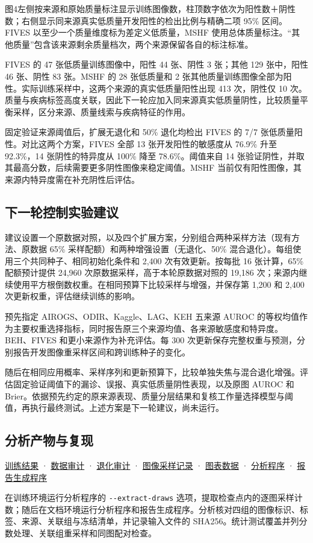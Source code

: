 \documentclass[
  10pt,
]{article}
\begin{document}
图4左侧按来源和原始质量标注显示训练图像数，柱顶数字依次为阳性数＋阴性数；右侧显示同来源真实低质量开发阳性的检出比例与精确二项
95\% 区间。FIVES 以至少一个质量维度标为差定义低质量，MSHF
使用总体质量标注。``其他质量''包含该来源剩余质量档次，两个来源保留各自的标注标准。

FIVES 的 47 张低质量训练图像中，阳性 44 张、阴性 3 张；其他 129
张中，阳性 46 张、阴性 83 张。MSHF 的 28 张低质量和 2
张其他质量训练图像全部为阳性。实际训练采样中，这两个来源的真实低质量阳性出现
413 次，阴性仅 10
次。质量与疾病标签高度关联，因此下一轮应加入同来源真实低质量阴性，比较质量平衡采样，区分来源、质量线索与疾病特征的作用。

固定验证来源阈值后，扩展无退化和 50\% 退化均检出 FIVES 的 7/7
张低质量阳性。对比这两个方案，FIVES 全部 13 张开发阳性的敏感度从 76.9\%
升至 92.3\%，14 张阴性的特异度从 100\% 降至 78.6\%。阈值来自 14
张验证阴性，并取其最高分数，后续需要更多阴性图像来稳定阈值。MSHF
当前仅有阳性图像，其来源内特异度需在补充阴性后评估。

\subsection{下一轮控制实验建议}\label{ux4e0bux4e00ux8f6eux63a7ux5236ux5b9eux9a8cux5efaux8bae}

建议设置一个原数据对照，以及四个扩展方案，分别组合两种采样方法（现有方法、原数据
65\% 采样配额）和两种增强设置（无退化、50\%
混合退化）。每组使用三个共同种子、相同初始化条件和 2,400
次有效更新。按每批 16 张计算，65\% 配额预计提供 24,960
次原数据采样，高于本轮原数据对照的 19,186
次；来源内继续使用平方根倒数权重。在相同预算下比较采样与增强，并保存第
1,200 和 2,400 次更新权重，评估继续训练的影响。

预先指定 AIROGS、ODIR、Kaggle、LAG、KEH 五来源 AUROC
的等权均值作为主要权重选择指标，同时报告原三个来源均值、各来源敏感度和特异度。BEH、FIVES
和更小来源作为补充评估。每 300
次更新保存完整权重与预测，分别报告开发图像重采样区间和跨训练种子的变化。

随后在相同应用概率、采样序列和更新预算下，比较单独失焦与混合退化增强。评估固定验证阈值下的漏诊、误报、真实低质量阴性表现，以及原图
AUROC 和
Brier。依据预先约定的原来源表现、质量分层结果和复核工作量选择模型与阈值，再执行最终测试。上述方案是下一轮建议，尚未运行。

\subsection{分析产物与复现}\label{ux5206ux6790ux4ea7ux7269ux4e0eux590dux73b0}

\href{../training-results/training-results.zh.md}{训练结果} ·
\href{../training-results/data-audit.zh.md}{数据审计} ·
\href{../training-results/degradation-audit.zh.md}{退化审计} ·
\href{training-exposure.json}{图像采样记录} ·
\href{figure-data.json}{图表数据} ·
\href{../../../../tools/analyze_expansion_results_20261113.py}{分析程序}
·
\href{../../../../tools/report_expansion_analysis_20261113.py}{报告生成程序}

在训练环境运行分析程序的 \texttt{-\/-extract-draws}
选项，提取检查点内的逐图采样计数；随后在文档环境运行分析程序和报告生成程序。分析核对四组的图像标识、标签、来源、关联组与冻结清单，并记录输入文件的
SHA256。统计测试覆盖并列分数处理、关联组重采样和同图配对检查。
\end{document}
